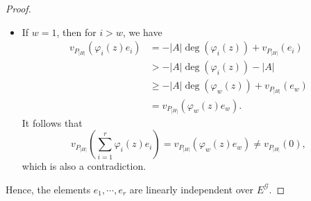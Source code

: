 \documentclass[journal,12pt,onecolumn]{IEEEtran}
\begin{document}
\begin{proof}
\begin{itemize}
\begin{align*}
        &>-|A|\deg(\varphi_w(z))-\mu_w-1\\
        &=v_{P_{\nu_w}}(\varphi_w(z)e_w).
    \end{align*}
    For $i>w$, we have
    \begin{align*}
        v_{P_{\nu_w}}(\varphi_i(z)e_i)&=-|A|\deg(\varphi_i(z))+v_{P_{\nu_w}}(e_i)\\
        &\ge-|A|\deg(\varphi_i(z))-|A|\\
        &\ge-|A|\deg(\varphi_w(z))\\
        &>-|A|\deg(\varphi_w(z))+v_{P_{\nu_w}}(e_w)\\
        &=v_{P_{\nu_w}}(\varphi_w(z)e_w).
    \end{align*}
    The Strict Triangle Inequality \cite[Lem. 1.1.11]{Algebraic_Function_Fields_and_Codes} yields
    \[
        v_{P_{\nu_w}}\left(\sum_{i=1}^r\varphi_i(z)e_i\right)=v_{P_{\nu_w}}(\varphi_w(z)e_w)\neq v_{P_{\nu_w}}(0),
    \]
    which is a contradiction since $\sum_{i=1}^r\varphi_i(z)e_i=0$. 

        \item If $w=1$, then for $i>w$, we have
        \begin{align*}
            v_{P_{|H|}}(\varphi_i(z)e_i)&=-|A|\deg(\varphi_i(z))+v_{P_{|H|}}(e_i)\\
            &>-|A|\deg(\varphi_i(z))-|A|\\
            &\ge-|A|\deg(\varphi_w(z))+v_{P_{|H|}}(e_w)\\
            &=v_{P_{|H|}}(\varphi_w(z)e_w).
        \end{align*}
    It follows that
    \[
        v_{P_{|H|}}\left(\sum_{i=1}^r\varphi_i(z)e_i\right)=v_{P_{|H|}}(\varphi_w(z)e_w)\neq v_{P_{|H|}}(0),
    \]
    which is also a contradiction. 
    \end{itemize}
    Hence, the elements $e_1,\cdots,e_r$ are linearly independent over $E^{\mathcal{G}}$. 


\end{proof}
\end{document}

